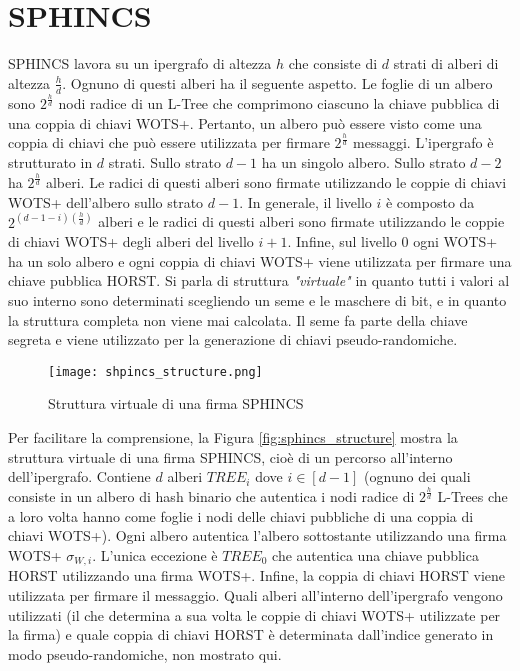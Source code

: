 \section{SPHINCS}
SPHINCS lavora su un ipergrafo di altezza \(h\) che consiste di \(d\) strati di alberi di altezza \(\frac{h}{d}\). Ognuno di questi alberi ha il seguente aspetto. Le foglie di un albero sono \(2^{\frac{h}{d}}\) nodi radice di un L-Tree che comprimono ciascuno la chiave pubblica di una coppia di chiavi WOTS+. Pertanto, un albero può essere visto come una coppia di chiavi che può essere utilizzata per firmare \(2^{\frac{h}{d}}\) messaggi. L'ipergrafo è strutturato in \(d\) strati. Sullo strato \(d - 1\) ha un singolo albero. Sullo strato \(d - 2\) ha \(2^{\frac{h}{d}}\) alberi. Le radici di questi alberi sono firmate utilizzando le coppie di chiavi WOTS+ dell'albero sullo strato \(d - 1\). In generale, il livello \(i\) è composto da \(2^{(d-1-i)(\frac{h}{d})}\) alberi e le radici di questi alberi sono firmate utilizzando le coppie di chiavi WOTS+ degli alberi del livello \(i + 1\). Infine, sul livello 0 ogni WOTS+ ha un solo albero e ogni coppia di chiavi WOTS+ viene utilizzata per firmare una chiave pubblica HORST. Si parla di struttura \textit{"virtuale"} in quanto tutti i valori al suo interno sono determinati scegliendo un seme e le maschere di bit, e in quanto la struttura completa non viene mai calcolata. Il seme fa parte della chiave segreta e viene utilizzato per la generazione di chiavi pseudo-randomiche.

\begin{figure}[h]
  \centering
  \texttt{[image: shpincs\_structure.png]}
  \caption{Struttura virtuale di una firma SPHINCS}
  \label{fig:shpincs_structure}
\end{figure}

Per facilitare la comprensione, la Figura \ref{fig:sphincs_structure} mostra la struttura virtuale di una firma SPHINCS, cioè di un percorso all'interno dell'ipergrafo. Contiene \(d\) alberi \(TREE_i\) dove \(i \in [d - 1]\) (ognuno dei quali consiste in un albero di hash binario che autentica i nodi radice di \(2^{\frac{h}{d}}\) L-Trees che a loro volta hanno come foglie i nodi delle chiavi pubbliche di una coppia di chiavi WOTS+). Ogni albero autentica l'albero sottostante utilizzando una firma WOTS+ \(\sigma_{W,i}\). L'unica eccezione è \(TREE_0\) che autentica una chiave pubblica HORST utilizzando una firma WOTS+. Infine, la coppia di chiavi HORST viene utilizzata per firmare il messaggio. Quali alberi all'interno dell'ipergrafo vengono utilizzati (il che determina a sua volta le coppie di chiavi WOTS+ utilizzate per la firma) e quale coppia di chiavi HORST è determinata dall'indice generato in modo pseudo-randomiche, non mostrato qui.

